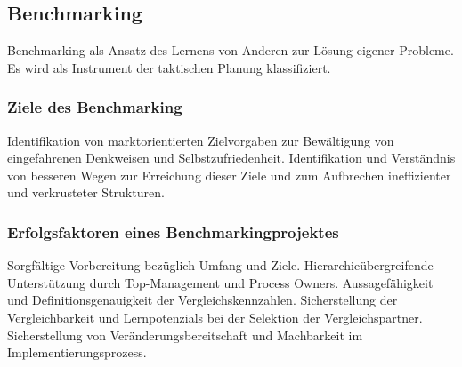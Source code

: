 \documentclass{article}
\begin{document}
\subsection{Benchmarking}
Benchmarking als Ansatz des Lernens von Anderen zur Lösung eigener
Probleme. Es wird als Instrument der taktischen Planung klassifiziert.
\subsubsection{Ziele des Benchmarking} 
Identifikation von marktorientierten Zielvorgaben zur Bewältigung von
eingefahrenen Denkweisen und Selbstzufriedenheit.
Identifikation und Verständnis von besseren Wegen zur Erreichung dieser
Ziele und zum Aufbrechen ineffizienter und verkrusteter Strukturen.
\subsubsection{Erfolgsfaktoren eines Benchmarkingprojektes}
Sorgfältige Vorbereitung bezüglich Umfang und Ziele.
Hierarchieübergreifende Unterstützung durch Top-Management und
Process Owners.
Aussagefähigkeit und Definitionsgenauigkeit der Vergleichskennzahlen.
Sicherstellung der Vergleichbarkeit und Lernpotenzials bei der Selektion
der Vergleichspartner.
Sicherstellung von Veränderungsbereitschaft und Machbarkeit im
Implementierungsprozess.
\end{document}
